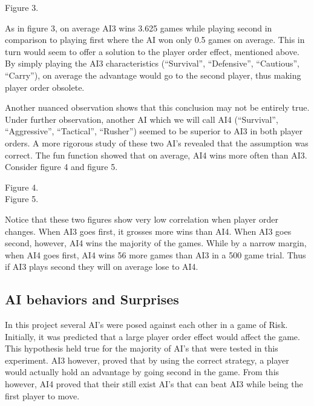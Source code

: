 \documentclass[12pt]{article}  %
\begin{document}
\begin{center}
{\footnotesize Figure 3.}
\end{center}


As in figure 3, on average AI3 wins 3.625 games while playing second in comparison to playing first where the AI won only 0.5 games on average. This in turn would seem to offer a solution to the player order effect, mentioned above. By simply playing the AI3 characteristics (“Survival”, “Defensive”, “Cautious”, “Carry”), on average the advantage would go to the second player, thus making player order obsolete. 


Another nuanced observation shows that this conclusion may not be entirely true. Under further observation, another AI which we will call AI4 (“Survival”, “Aggressive”, “Tactical”, “Rusher”) seemed to be superior to AI3 in both player orders. A more rigorous study of these two AI’s revealed that the assumption was correct. The fun function showed that on average, AI4 wins more often than AI3. Consider figure 4 and figure 5. 



\begin{center}
{\footnotesize Figure 4.}\\
{\footnotesize Figure 5.}
\end{center}

Notice that these two figures show very low correlation when player order changes. When AI3 goes first, it grosses more wins than AI4. When AI3 goes second, however, AI4 wins the majority of the games. While by a narrow margin, when AI4 goes first, AI4 wins 56 more games than AI3 in a 500 game trial. Thus if AI3 plays second they will on average lose to AI4. 


\subsection{AI behaviors and Surprises}
In this project several AI’s were posed against each other in a game of Risk. Initially, it was predicted that a large player order effect would affect the game. This hypothesis held true for the majority of AI’s that were tested in this experiment. AI3 however, proved that by using the correct strategy, a player would actually hold an advantage by going second in the game. From this however, AI4 proved that their still exist AI’s that can beat AI3 while being the first player to move. 
\end{document}

